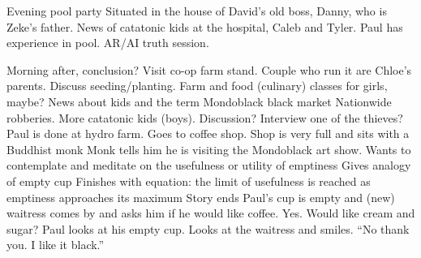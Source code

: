 \documentclass[12pt]{article}
\begin{document}
\begin{outline}[enumerate]
\1 Evening pool party
  \2 Situated in the house of David's old boss, Danny, who is
  Zeke's father.
  \2 News of catatonic kids at the hospital, Caleb and Tyler.
  \2 Paul has experience in pool.
    \3 AR/AI truth session.

\1 Morning after, conclusion?
  \2 Visit co-op farm stand. Couple who run it are Chloe's
  parents. Discuss seeding/planting. Farm and food (culinary)
  classes for girls, maybe?
  \2 News about kids and the term Mondoblack black market
    \3 Nationwide robberies. More catatonic kids (boys).
    \3 Discussion?
    \3 Interview one of the thieves?
  \2 Paul is done at hydro farm. Goes to coffee shop. Shop is very full and sits with a Buddhist monk
    \3 Monk tells him he is visiting the Mondoblack art show.
    \3 Wants to contemplate and meditate on the usefulness or
    utility of emptiness
    \3 Gives analogy of empty cup
    \3 Finishes with equation: the limit of usefulness is
    reached as emptiness approaches its maximum 
  \2 Story ends
    \3 Paul's cup is empty and (new) waitress comes by and asks
    him if he would like coffee. Yes. Would like cream and
    sugar? Paul looks at his empty cup. Looks at the waitress
    and smiles. ``No thank you. I like it black.''

\end{outline}
\end{document}
